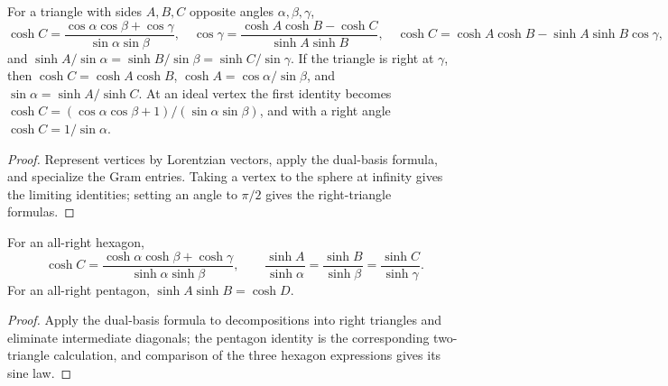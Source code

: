 \begin{proposition}
\label{thurston-ch02-triangle-identities}
For a triangle with sides $A,B,C$ opposite angles $\alpha,\beta,\gamma$,
\[
\cosh C=\frac{\cos\alpha\cos\beta+\cos\gamma}{\sin\alpha\sin\beta},\quad
\cos\gamma=\frac{\cosh A\cosh B-\cosh C}{\sinh A\sinh B},\quad
\cosh C=\cosh A\cosh B-\sinh A\sinh B\cos\gamma,
\]
and $\sinh A/\sin\alpha=\sinh B/\sin\beta=\sinh C/\sin\gamma$. If the triangle is right at $\gamma$, then $\cosh C=\cosh A\cosh B$, $\cosh A=\cos\alpha/\sin\beta$, and $\sin\alpha=\sinh A/\sinh C$. At an ideal vertex the first identity becomes $\cosh C=(\cos\alpha\cos\beta+1)/(\sin\alpha\sin\beta)$, and with a right angle $\cosh C=1/\sin\alpha$.
\end{proposition}
\begin{proof}\sketch Represent vertices by Lorentzian vectors, apply the dual-basis formula, and specialize the Gram entries. Taking a vertex to the sphere at infinity gives the limiting identities; setting an angle to $\pi/2$ gives the right-triangle formulas.\end{proof}

\begin{proposition}
\label{thurston-ch02-right-polygon-identities}
For an all-right hexagon,
\[
\cosh C=\frac{\cosh\alpha\cosh\beta+\cosh\gamma}{\sinh\alpha\sinh\beta},\qquad
\frac{\sinh A}{\sinh\alpha}=\frac{\sinh B}{\sinh\beta}=\frac{\sinh C}{\sinh\gamma}.
\]
For an all-right pentagon, $\sinh A\sinh B=\cosh D$.
\end{proposition}
\begin{proof}\sketch Apply the dual-basis formula to decompositions into right triangles and eliminate intermediate diagonals; the pentagon identity is the corresponding two-triangle calculation, and comparison of the three hexagon expressions gives its sine law.\end{proof}
